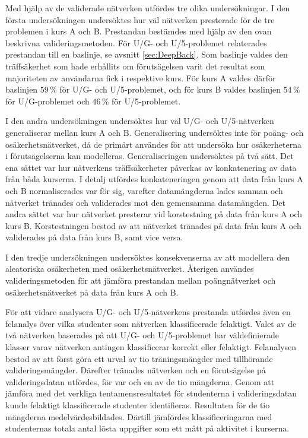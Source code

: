 Med hjälp av de validerade nätverken utfördes tre olika undersökningar. I den första undersökningen undersöktes hur väl nätverken presterade för de tre problemen i kurs A och B. Prestandan bestämdes med hjälp av den ovan beskrivna valideringsmetoden. För U/G- och U/5-problemet relaterades prestandan till en baslinje, se avsnitt \ref{sec:DeepBack}. Som baslinje valdes den träffsäkerhet som hade erhållits om förutsägelsen varit det resultat som majoriteten av användarna fick i respektive kurs. För kurs A valdes därför baslinjen $59 \, \%$ för U/G- och U/5-problemet, och för kurs B valdes baslinjen $54 \, \%$ för U/G-problemet och $46 \, \%$ för U/5-problemet. 

I den andra undersökningen undersöktes hur väl U/G- och U/5-nätverken generaliserar mellan kurs A och B. Generalisering undersöktes inte för poäng- och osäkerhetsnätverket, då de primärt användes för att undersöka hur osäkerheterna i förutsägelserna kan modelleras. Generaliseringen undersöktes på två sätt. Det ena sättet var hur nätverkens träffsäkerheter påverkas av konkatenering av data från båda kurserna. I detalj utfördes konkateneringen genom att data från kurs A och B normaliserades var för sig, varefter datamängderna lades samman och nätverket tränades och validerades mot den gemensamma datamängden. Det andra sättet var hur nätverket presterar vid korstestning på data från kurs A och kurs B. Korstestningen bestod av att nätverket tränades på data från kurs A och validerades på data från kurs B, samt vice versa. 

I den tredje undersökningen undersöktes konsekvenserna av att modellera den aleatoriska osäkerheten med osäkerhetsnätverket. Återigen användes valideringsmetoden för att jämföra prestandan mellan poängnätverket och osäkerhetsnätverket på data från kurs A och B. 

För att vidare analysera U/G- och U/5-nätverkens prestanda utfördes även en felanalys över vilka studenter som nätverken klassificerade felaktigt. Valet av de två nätverken baserades på att U/G- och U/5-problemet har väldefinierade klasser varav nätverken antingen klassificerar korrekt eller felaktigt. Felanalysen bestod av att först göra ett urval av tio träningsmängder med tillhörande valideringsmängder. Därefter tränades nätverken och en förutsägelse på valideringsdatan utfördes, för var och en av de tio mängderna. Genom att jämföra med det verkliga tentamensresultatet för studenterna i valideringsdatan kunde felaktigt klassificerade studenter identifieras. Resultaten för de tio mängderna medelvärdesbildades. Därtill jämfördes klassificeringarna med studenternas totala antal lösta uppgifter som ett mått på aktivitet i kurserna.



